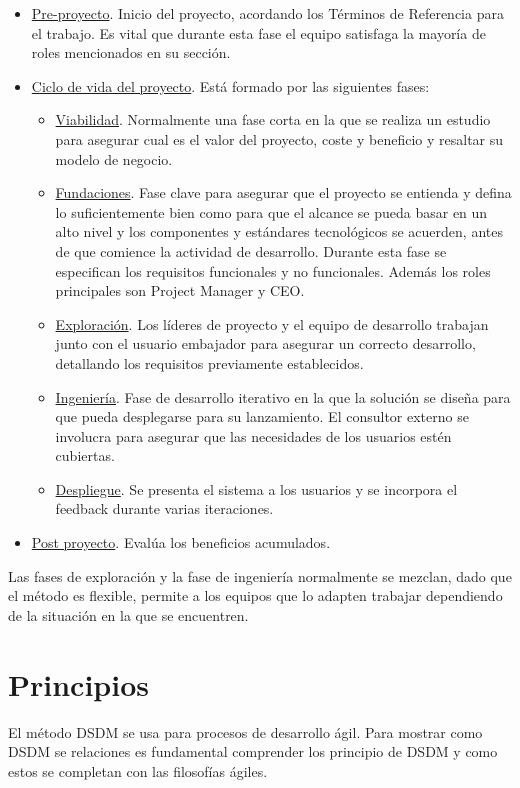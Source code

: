 \documentclass[12pt,a4paper]{article}
\begin{document}
\begin{itemize}
	\item \underline{Pre-proyecto}. Inicio del proyecto, acordando los Términos de Referencia para el trabajo. Es vital que durante esta fase el equipo satisfaga la mayoría de roles mencionados en su sección.
	\item \underline{Ciclo de vida del proyecto}. Está formado por las siguientes fases:
	\begin{itemize}
		\item \underline{Viabilidad}. Normalmente una fase corta en la que se realiza un estudio para asegurar cual es el valor del proyecto, coste y beneficio y resaltar su modelo de negocio.
		\item \underline{Fundaciones}. Fase clave para asegurar que el proyecto se entienda y defina lo suficientemente bien como para que el alcance se pueda basar en un alto nivel y los componentes y estándares tecnológicos se acuerden, antes de que comience la actividad de desarrollo. Durante esta fase se especifican los requisitos funcionales y no funcionales. Además los roles principales son Project Manager y CEO.
		\item \underline{Exploración}. Los líderes de proyecto y el equipo de desarrollo trabajan junto con el usuario embajador para asegurar un correcto desarrollo, detallando los requisitos previamente establecidos.
		\item \underline{Ingeniería}. Fase de desarrollo iterativo en la que la solución se diseña para que pueda desplegarse para su lanzamiento. El consultor externo se involucra para asegurar que las necesidades de los usuarios estén cubiertas.
		\item \underline{Despliegue}. Se presenta el sistema a los usuarios y se incorpora el feedback durante varias iteraciones.
	\end{itemize}
 	\item \underline{Post proyecto}. Evalúa los beneficios acumulados.
\end{itemize}

Las fases de exploración y la fase de ingeniería normalmente se mezclan, dado que el método es flexible, permite a los equipos que lo adapten trabajar dependiendo de la situación en la que se encuentren.


\section{Principios}
El método DSDM se usa para procesos de desarrollo ágil. Para mostrar como DSDM se relaciones es fundamental comprender los principio de DSDM y como estos se completan con las filosofías ágiles.\\
\end{document}
